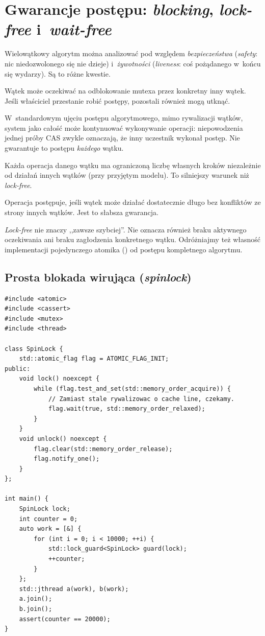 \section{Gwarancje postępu: \emph{blocking}, \emph{lock-free} i~\emph{wait-free}}
\label{sec:cpp16-progress}

Wielowątkowy algorytm można analizować pod względem \emph{bezpieczeństwa}
(\emph{safety}: nic niedozwolonego się nie dzieje) i~\emph{żywotności}
(\emph{liveness}: coś pożądanego w~końcu się wydarzy). Są to różne kwestie.

\begin{description}[style=nextline]
\item[\emph{Blocking}]
  Wątek może oczekiwać na odblokowanie mutexa przez konkretny inny wątek.
  Jeśli właściciel przestanie robić postępy, pozostali również mogą utknąć.
\item[\emph{Lock-free}]
  W~standardowym ujęciu postępu algorytmowego, mimo rywalizacji wątków,
  system jako całość może kontynuować wykonywanie operacji:
  niepowodzenia jednej próby CAS zwykle oznaczają, że inny uczestnik
  wykonał postęp. Nie gwarantuje to postępu \emph{każdego} wątku.
\item[\emph{Wait-free}]
  Każda operacja danego wątku ma ograniczoną liczbę własnych kroków
  niezależnie od działań innych wątków (przy przyjętym modelu).
  To silniejszy warunek niż \emph{lock-free}.
\item[\emph{Obstruction-free}]
  Operacja postępuje, jeśli wątek może działać dostatecznie długo
  bez konfliktów ze strony innych wątków. Jest to słabsza gwarancja.
\end{description}

\emph{Lock-free} nie znaczy ,,zawsze szybciej''. Nie oznacza również
braku aktywnego oczekiwania ani braku zagłodzenia konkretnego wątku.
Odróżniajmy też własność implementacji pojedynczego atomika
() od postępu kompletnego algorytmu.

\subsection{Prosta blokada wirująca (\emph{spinlock})}

\begin{lstlisting}[caption={Poprawna blokada wirująca z flagą atomową; ilustracja (C++20).}]
#include <atomic>
#include <cassert>
#include <mutex>
#include <thread>

class SpinLock {
    std::atomic_flag flag = ATOMIC_FLAG_INIT;
public:
    void lock() noexcept {
        while (flag.test_and_set(std::memory_order_acquire)) {
            // Zamiast stale rywalizowac o cache line, czekamy.
            flag.wait(true, std::memory_order_relaxed);
        }
    }
    void unlock() noexcept {
        flag.clear(std::memory_order_release);
        flag.notify_one();
    }
};

int main() {
    SpinLock lock;
    int counter = 0;
    auto work = [&] {
        for (int i = 0; i < 10000; ++i) {
            std::lock_guard<SpinLock> guard(lock);
            ++counter;
        }
    };
    std::jthread a(work), b(work);
    a.join();
    b.join();
    assert(counter == 20000);
}
\end{lstlisting}

